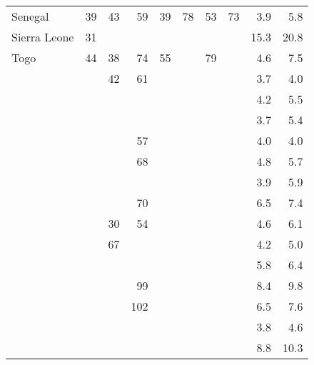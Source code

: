 \begin{longtable}{p{3cm}<{\raggedright}d{2.0}d{3.0}d{3.0}d{2.0}d{2.0}d{2.0}d{2.0}d{2.1}d{2.1}}
     \hspace{2pt}\hangindent=4pt\relax Senegal & 39 & 43 & 59 & 39 & 78 & 53 & 73 & 3.9 & 5.8 \\ 
     \hspace{2pt}\hangindent=4pt\relax Sierra Leone & 31 &  &  &  &  &  &  & 15.3 & 20.8 \\ 
     \hspace{2pt}\hangindent=4pt\relax Togo & 44 & 38 & 74 & 55 &  & 79 &  & 4.6 & 7.5 \\ 
   &  & 42 & 61 &  &  &  &  & 3.7 & 4.0 \\ 
   &  &  &  &  &  &  &  & 4.2 & 5.5 \\ 
   &  &  &  &  &  &  &  & 3.7 & 5.4 \\ 
   &  &  & 57 &  &  &  &  & 4.0 & 4.0 \\ 
   &  &  & 68 &  &  &  &  & 4.8 & 5.7 \\ 
   &  &  &  &  &  &  &  & 3.9 & 5.9 \\ 
   &  &  & 70 &  &  &  &  & 6.5 & 7.4 \\ 
   &  & 30 & 54 &  &  &  &  & 4.6 & 6.1 \\ 
   &  & 67 &  &  &  &  &  & 4.2 & 5.0 \\ 
   &  &  &  &  &  &  &  & 5.8 & 6.4 \\ 
   &  &  & 99 &  &  &  &  & 8.4 & 9.8 \\ 
   &  &  & 102 &  &  &  &  & 6.5 & 7.6 \\ 
   &  &  &  &  &  &  &  & 3.8 & 4.6 \\ 
   &  &  &  &  &  &  &  & 8.8 & 10.3 \\ 
  \hline
\end{longtable}
